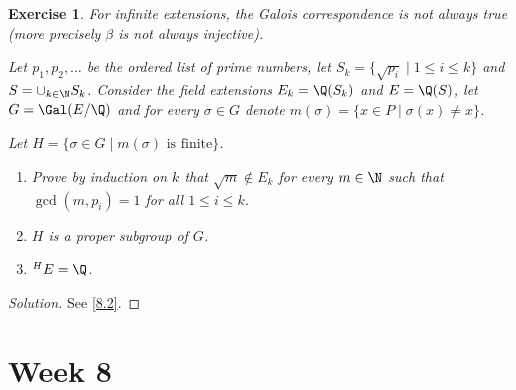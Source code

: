 \documentclass[a4paper,10pt,reqno]{amsart}
\newtheorem{ex}{Exercise}[section]
\newenvironment{sol}
  {\renewcommand\qedsymbol{$\blacksquare$}\begin{proof}[Solution]}
  {\end{proof}}
\begin{document}
\begin{ex}
\label{7.5}
For infinite extensions, the Galois correspondence is not always true (more precisely $\beta$ is not always injective).

Let $p_1,p_2,\dots$ be the ordered list of prime numbers, let
$S_k=\{\sqrt{p_i}\mid 1\leq i\leq k\}$ and 
$S=\cup_{k\in\N} S_k$.
Consider the field 
extensions $E_k=\Q(S_k)$ 
and $E=\Q(S)$,
let $G=\Gal(E/\Q)$ and for every $\sigma\in G$ 
denote $m(\sigma)=\{x\in P\mid \sigma(x)\neq x\}$.

Let $H=\{\sigma \in G\mid m(\sigma)\text{ is finite}\}$.
\begin{enumerate}[label=(\roman*)]
        \item Prove by induction on $k$ that 
        $\sqrt{m}\notin E_k$
        for every $m\in \N$ such that $\gcd(m,p_i)=1$ for all $1\leq i\leq k$.
        \item $H$ is a proper subgroup of $G$.
        \item ${}^HE=\Q$.
    \end{enumerate}
\end{ex}
\begin{sol}
    See \cref{8.2}.
\end{sol}

\newpage

\section{Week 8}
\end{document}
